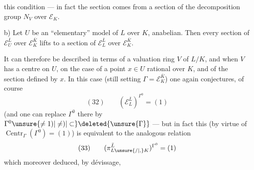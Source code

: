  this condition --- in fact the section comes from a section of the decomposition group $N_V$ over $\mathcal E_K$.

\noindent b) Let $U$ be an ``elementary'' model of $L$ over $K$, anabelian. Then every section of $\mathcal E_U^{\bar L}$ over $\mathcal E_K^{\bar K}$ lifts to a section of $\mathcal E_L^{\bar L}$ over $\mathcal E_K^{\bar K}$.

It can therefore be described in terms of a valuation ring $V$ of $L/K$, and when $V$ has a centre on $U$,   on the case of a point $x\in U$ rational over $K$, and of the section defined by $x$. In this case (still setting $\Gamma=\mathcal E_K^{\bar K}$) one again conjectures, of course
\[
(32)\qquad (\mathcal E_L^{\bar L})^{\Gamma^0}=(1)
\]
(and one can replace $\Gamma^0$ there by $\Gamma^0\unsure{\ne1)|\ne)|\subset}\deleted{\unsure{\Gamma}}$
--- but in fact this (by virtue of $\operatorname{Centr}_\Gamma(\Gamma^0)=(1)$) is equivalent to the analogous relation 
\[
(33)\qquad (\pi_{L\unsure{/|,}K}^{\bar L})^{\Gamma^0}=(1)
\]
which  moreover deduced, by dévissage,
